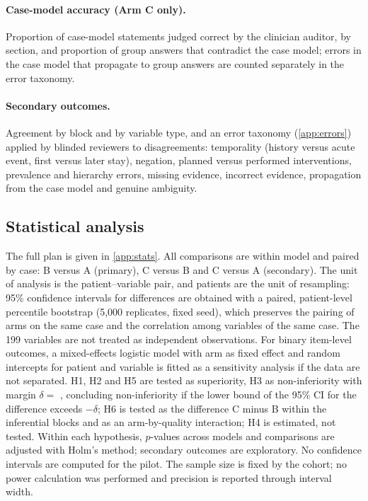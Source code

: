\paragraph{Case-model accuracy (Arm C only).} Proportion of case-model statements judged correct by the
clinician auditor, by section, and proportion of group answers that contradict the case model; errors in the
case model that propagate to group answers are counted separately in the error taxonomy.

\paragraph{Secondary outcomes.} Agreement by block and by variable type, and an error taxonomy
(\ref{app:errors}) applied by blinded reviewers to disagreements: temporality (history versus acute event,
first versus later stay), negation, planned versus performed interventions, prevalence and hierarchy
errors, missing evidence, incorrect evidence, propagation from the case model and genuine ambiguity.

\subsection{Statistical analysis}\label{sec:stats}

The full plan is given in \ref{app:stats}. All comparisons are within model and paired by case: B versus A
(primary), C versus B and C versus A (secondary). The unit of analysis is the patient--variable pair, and
patients are the unit of resampling: 95\% confidence intervals for differences are obtained with a paired,
patient-level percentile bootstrap (5{,}000 replicates, fixed seed), which preserves the pairing of arms on
the same case and the correlation among variables of the same case. The 199 variables are not treated as
independent observations. For binary item-level outcomes, a mixed-effects logistic model with arm as fixed
effect and random intercepts for patient and variable is fitted as a sensitivity analysis if the data are not
separated. H1, H2 and H5 are tested as superiority, H3 as non-inferiority with margin
$\delta = $ , concluding
non-inferiority if the lower bound of the 95\% CI for the difference exceeds $-\delta$; H6 is tested as the
difference C minus B within the inferential blocks and as an arm-by-quality interaction; H4 is estimated,
not tested. Within each hypothesis, $p$-values across models and comparisons are adjusted with Holm's
method; secondary outcomes are exploratory. No confidence intervals are computed for the pilot. The sample
size is fixed by the cohort; no power calculation was performed and precision is reported through interval
width.

